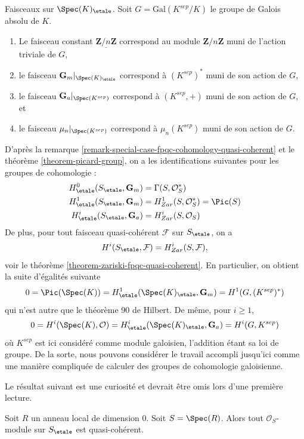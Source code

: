 \begin{example}
\label{example-sheaves-point}
Faisceaux sur $\Spec(K)_\etale$.
Soit $G = \text{Gal}(K^{sep}/K)$ le groupe de Galois absolu de $K$.
\begin{enumerate}
\item Le faisceau constant $\underline{\mathbf{Z}/n\mathbf{Z}}$ correspond au
module $\mathbf{Z}/n\mathbf{Z}$ muni de l'action triviale de $G$,
\item le faisceau $\mathbf{G}_m|_{\Spec(K)_\etale}$ correspond \`a
$(K^{sep})^*$ muni de son action de $G$,
\item le faisceau $\mathbf{G}_a|_{\Spec(K^{sep})}$ correspond \`a
$(K^{sep}, +)$ muni de son action de $G$, et
\item le faisceau $\mu_n|_{\Spec(K^{sep})}$ correspond \`a
$\mu_n(K^{sep})$ muni de son action de $G$.
\end{enumerate}
D'apr\`es la
remarque \ref{remark-special-case-fpqc-cohomology-quasi-coherent}
et le
th\'eor\`eme \ref{theorem-picard-group},
on a les identifications suivantes pour les groupes de cohomologie :
\begin{align*}
H_\etale^0(S_\etale, \mathbf{G}_m) & =
\Gamma(S, \mathcal{O}_S^*) \\
H_\etale^1(S_\etale, \mathbf{G}_m) & =
H_{Zar}^1(S, \mathcal{O}_S^*) = \Pic(S) \\
H_\etale^i(S_\etale, \mathbf{G}_a) & =
H_{Zar}^i(S, \mathcal{O}_S)
\end{align*}
De plus, pour tout faisceau quasi-coh\'erent $\mathcal{F}$ sur $S_\etale$, on a
$$
H^i(S_\etale, \mathcal{F}) = H_{Zar}^i(S, \mathcal{F}),
$$
voir le
th\'eor\`eme \ref{theorem-zariski-fpqc-quasi-coherent}.
En particulier, on obtient la suite d'\'egalit\'es suivante
$$
0 =
\Pic(\Spec(K)) =
H_\etale^1(\Spec(K)_\etale, \mathbf{G}_m) =
H^1(G, (K^{sep})^*)
$$
qui n'est autre que le th\'eor\`eme 90 de Hilbert. De m\^eme, pour $i \geq 1$,
$$
0 = H^i(\Spec(K), \mathcal{O})
= H_\etale^i(\Spec(K)_\etale, \mathbf{G}_a)
= H^i(G, K^{sep})
$$
o\`u $K^{sep}$ est ici consid\'er\'e comme module galoisien, l'addition \'etant
sa loi de groupe. De la sorte, nous pouvons consid\'erer le travail accompli jusqu'ici comme
une mani\`ere compliqu\'ee de calculer des groupes de cohomologie galoisienne.
\end{example}

\noindent
Le r\'esultat suivant est une curiosit\'e et devrait \^etre omis lors d'une
premi\`ere lecture.

\begin{lemma}
\label{lemma-all-modules-quasi-coherent}
Soit $R$ un anneau local de dimension $0$. Soit $S = \Spec(R)$.
Alors tout $\mathcal{O}_S$-module sur $S_\etale$ est quasi-coh\'erent.
\end{lemma}

